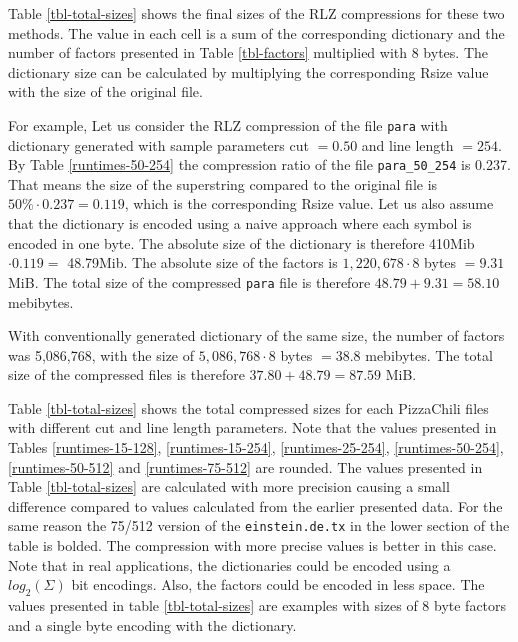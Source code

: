 \documentclass[english,twoside,censored,csm,algorithms-track-2020]{HYthesisML}
\theoremstyle{plain}
\theoremstyle{definition}
\begin{document}
Table \ref{tbl-total-sizes} shows
the final sizes of the RLZ compressions for these two methods. The value in each cell is a sum of
the corresponding dictionary and the number of factors presented in Table \ref{tbl-factors} multiplied
with 8 bytes. The dictionary size can be calculated by multiplying the corresponding Rsize value with
the size of the original file.

For example, Let us consider the RLZ compression of the file \texttt{para} with dictionary
generated with sample
parameters cut $= 0.50$ and line length $= 254$.
By Table \ref{runtimes-50-254} the compression ratio of the
file \texttt{para\_50\_254} is 0.237. That means the size of the superstring compared to the
original file is $50\% \cdot 0.237 = 0.119$, which is the corresponding Rsize value.
Let us also assume that the dictionary is encoded using a naive approach where each symbol is
encoded in one byte.
The absolute
size of the dictionary is therefore 410Mib $\cdot 0.119 = $ 48.79Mib. The absolute size of the
factors is $1,220,678\cdot 8$ bytes $= 9.31$ MiB. The total size of the compressed \texttt{para}
file is therefore $48.79 + 9.31 = 58.10$ mebibytes.

With conventionally generated dictionary of the same size, the number of factors was 5,086,768,
with the size of $5,086,768\cdot 8$ bytes $= 38.8$ mebibytes. The total size of the compressed
files is therefore $37.80 + 48.79 = 87.59$ MiB.

Table \ref{tbl-total-sizes} shows the total compressed sizes for each PizzaChili files with different
cut and line length parameters. Note that the values presented in Tables \ref{runtimes-15-128},
\ref{runtimes-15-254}, \ref{runtimes-25-254}, \ref{runtimes-50-254}, \ref{runtimes-50-512} and
\ref{runtimes-75-512} are rounded. The values presented in Table \ref{tbl-total-sizes} are
calculated with more precision causing a small difference compared to values calculated from the
earlier presented data. For the same reason the 75/512 version of the \texttt{einstein.de.tx}
in the lower section of the table is bolded. The compression with more precise values is better
in this case. Note that in real applications, the dictionaries could be encoded using a
$log_2(\Sigma)$ bit encodings. Also, the factors could be encoded in less space. The values
presented in table \ref{tbl-total-sizes} are examples with sizes of 8 byte factors and a single
byte encoding with the dictionary.
\end{document}
